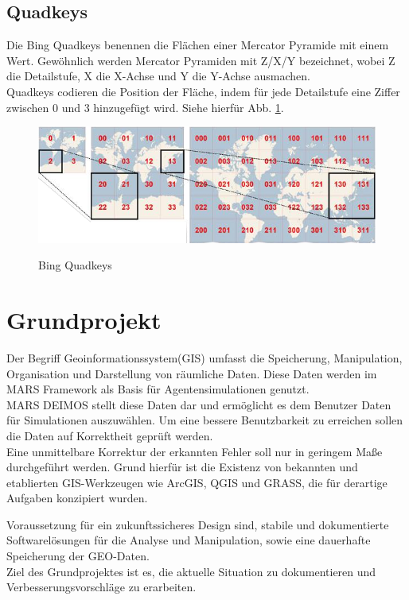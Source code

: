 \documentclass[10pt,conference,compsocconf]{IEEEtran}
\begin{document}
\subsection{Quadkeys}
\label{Quadyeys}
Die Bing Quadkeys benennen die Flächen einer Mercator Pyramide mit einem Wert. Gewöhnlich werden Mercator Pyramiden mit Z/X/Y bezeichnet, wobei Z die Detailstufe, X die X-Achse und Y die Y-Achse ausmachen.\\
Quadkeys codieren die Position der Fläche, indem für jede Detailstufe eine Ziffer zwischen 0 und 3 hinzugefügt wird. Siehe hierfür Abb. \ref{img:bing_quads}.\\
\begin{figure}[H]
	\centering
	\includegraphics[width=1\columnwidth]{img/bing_quads.png}\\
	\caption[]{Bing Quadkeys\cite{BingQuadkeys}}
	\label{img:bing_quads}
\end{figure}



\section{Grundprojekt}
Der Begriff Geoinformationssystem(GIS) umfasst die Speicherung, Manipulation, Organisation und Darstellung von räumliche Daten. Diese Daten werden im MARS Framework als Basis für Agentensimulationen genutzt.\\
MARS DEIMOS stellt diese Daten dar und ermöglicht es dem Benutzer Daten für Simulationen auszuwählen. Um eine bessere Benutzbarkeit zu erreichen sollen die Daten auf Korrektheit geprüft werden.\\
Eine unmittelbare Korrektur der erkannten Fehler soll nur in geringem Maße durchgeführt werden. Grund hierfür ist die Existenz von bekannten und etablierten GIS-Werkzeugen wie ArcGIS, QGIS und GRASS, die für derartige Aufgaben konzipiert wurden.\par
Voraussetzung für ein zukunftssicheres Design sind, stabile und dokumentierte Softwarelösungen für die Analyse und Manipulation, sowie eine dauerhafte Speicherung der GEO-Daten.\\
Ziel des Grundprojektes ist es, die aktuelle Situation zu dokumentieren und Verbesserungsvorschläge zu erarbeiten.
\end{document}

